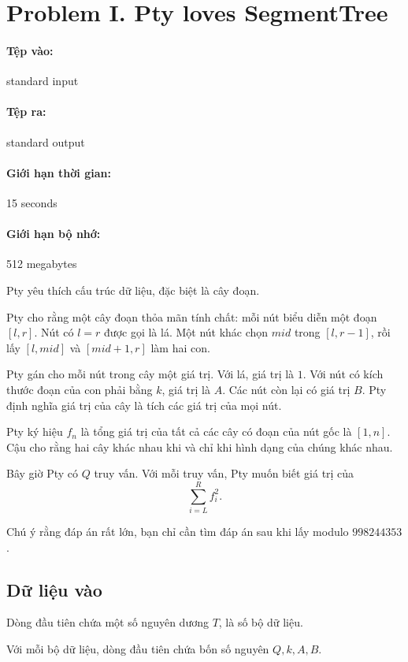 \documentclass[11pt]{article}
\begin{document}
\section{Problem I. Pty loves SegmentTree}

\paragraph{Tệp vào:} standard input
\paragraph{Tệp ra:} standard output
\paragraph{Giới hạn thời gian:} 15 seconds
\paragraph{Giới hạn bộ nhớ:} 512 megabytes

Pty yêu thích cấu trúc dữ liệu, đặc biệt là cây đoạn.

Pty cho rằng một cây đoạn thỏa mãn tính chất: mỗi nút biểu diễn một đoạn
\([l,r]\). Nút có \(l=r\) được gọi là lá. Một nút khác chọn
\(\mathit{mid}\) trong \([l,r-1]\), rồi lấy \([l,\mathit{mid}]\) và
\([\mathit{mid}+1,r]\) làm hai con.

Pty gán cho mỗi nút trong cây một giá trị. Với lá, giá trị là \(1\). Với nút
có kích thước đoạn của con phải bằng \(k\), giá trị là \(A\). Các nút còn lại
có giá trị \(B\). Pty định nghĩa giá trị của cây là tích các giá trị của mọi
nút.

Pty ký hiệu \(f_n\) là tổng giá trị của tất cả các cây có đoạn của nút gốc là
\([1,n]\). Cậu cho rằng hai cây khác nhau khi và chỉ khi hình dạng của chúng
khác nhau.

Bây giờ Pty có \(Q\) truy vấn. Với mỗi truy vấn, Pty muốn biết giá trị của
\[
  \sum_{i=L}^{R} f_i^2.
\]

Chú ý rằng đáp án rất lớn, bạn chỉ cần tìm đáp án sau khi lấy modulo
\(998244353\).

\subsection*{Dữ liệu vào}

Dòng đầu tiên chứa một số nguyên dương \(T\), là số bộ dữ liệu.

Với mỗi bộ dữ liệu, dòng đầu tiên chứa bốn số nguyên \(Q,k,A,B\).
\end{document}
